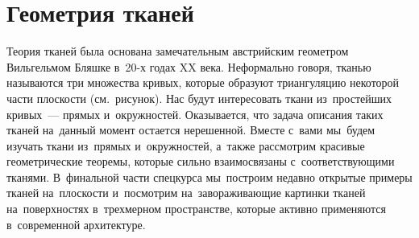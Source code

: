 
\section*{Геометрия тканей}



\begin{minipage}{0.73\textwidth}%
Теория тканей была основана замечательным австрийским геометром Вильгельмом
Бляшке в~20-х годах XX века.
Неформально говоря, тканью называются три множества кривых, которые образуют
триангуляцию некоторой части плоскости (см.~рисунок).
Нас будут интересовать ткани из~простейших кривых~--- прямых и~окружностей.
Оказывается, что задача описания таких тканей на~данный момент остается
нерешенной.
Вместе с~вами мы~будем изучать ткани из~прямых и~окружностей, а~также
рассмотрим красивые геометрические теоремы, которые сильно взаимосвязаны
с~соответствующими тканями.
В~финальной части спецкурса мы~построим недавно открытые примеры тканей
на~плоскости и~посмотрим на~завораживающие картинки тканей на~поверхностях
в~трехмерном пространстве, которые активно применяются в~современной
архитектуре.
\end{minipage}%
\hspace{0.05\textwidth}%
\begin{minipage}{0.22\textwidth}
\\[1em]
\end{minipage}

